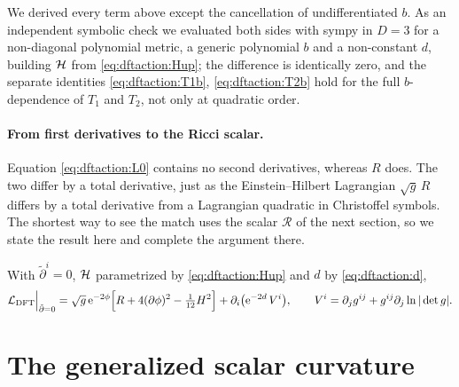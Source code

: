 \noindent We derived every term above except the cancellation of undifferentiated $b$. As an
independent symbolic check we evaluated both sides with sympy in $D=3$ for a non-diagonal
polynomial metric, a generic polynomial $b$ and a non-constant $d$, building $\mathcal{H}$ from
\eqref{eq:dftaction:Hup}; the difference is identically zero, and the separate identities
\eqref{eq:dftaction:T1b}, \eqref{eq:dftaction:T2b} hold for the full $b$-dependence of $T_1$ and
$T_2$, not only at quadratic order.

\paragraph{From first derivatives to the Ricci scalar.} Equation \eqref{eq:dftaction:L0}
contains no second derivatives, whereas $R$ does. The two differ by a total derivative, just as
the Einstein--Hilbert Lagrangian $\sqrt g\,R$ differs by a total derivative from a Lagrangian
quadratic in Christoffel symbols. The shortest way to see the match uses the scalar
$\mathcal R$ of the next section, so we state the result here and complete the argument there.

\begin{theorem}\label{thm:dftaction:reduction}
With $\tilde\partial^i=0$, $\mathcal{H}$ parametrized by \eqref{eq:dftaction:Hup} and $d$ by
\eqref{eq:dftaction:d},
\begin{equation}\label{eq:dftaction:reduction}
\mathcal L_{\text{DFT}}\Big|_{\tilde\partial=0}=\sqrt g\,\mathrm{e}^{-2\phi}\Bigl[R+4(\partial\phi)^2-
\tfrac1{12}H^2\Bigr]+\partial_i\bigl(\mathrm{e}^{-2d}\,V^i\bigr),\qquad
V^i=\partial_jg^{ij}+g^{ij}\partial_j\ln|\det g| .
\end{equation}
\TL {}
\end{theorem}

\section{The generalized scalar curvature}\label{sec:dftaction:curvature}

